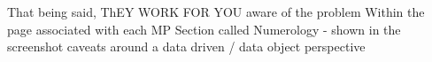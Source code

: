 That being said, 
ThEY WORK FOR YOU
  aware of the problem
  Within the page associated with each MP
  Section called Numerology - shown in the screenshot
  caveats around a data driven / data object perspective